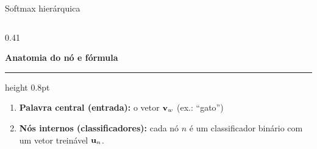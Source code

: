\begin{frame}{Softmax hierárquica}
    \begin{columns}[T]
        \begin{column}{0.41\textwidth}
            {\color{dexpiBlue}\small\textbf{Anatomia do nó e fórmula}\par\vspace{2pt}\hrule height 0.8pt}
            \vspace{3pt}
            \footnotesize
            \begin{enumerate}\setlength{\itemsep}{2pt}
                \item \textbf{Palavra central (entrada):} o vetor $\mathbf{v}_w$ (ex.: ``gato'') 
                \item \textbf{Nós internos (classificadores):} cada nó $n$ é um classificador binário com um vetor treinável $\mathbf{u}_n$.
            \end{enumerate}
            \vspace{1pt}


\end{column}
\end{columns}
\end{frame}
